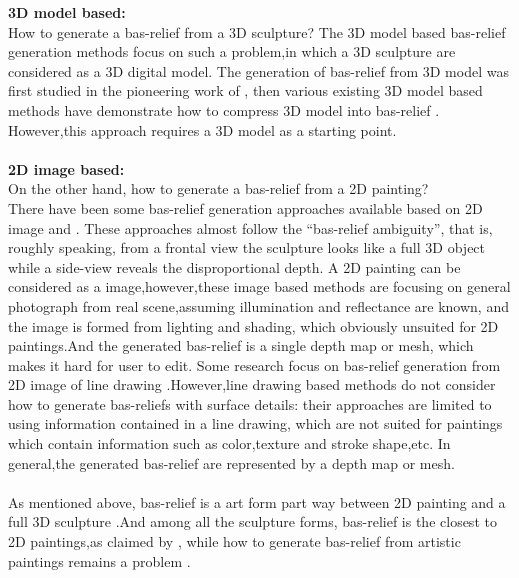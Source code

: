 \textbf{3D model based:}\\ How to generate a bas-relief from a 3D sculpture? The 3D model based bas-relief generation methods focus on such a problem,in which a 3D sculpture are considered as a 3D digital model.   The generation of bas-relief from 3D model was first studied in the pioneering work of \cite{cignoni1997computer}, then various existing 3D model based methods have demonstrate how to compress 3D model into bas-relief \cite{weyrich2007digital}\cite{kerber2009feature}\cite{song2007automatic}\cite{sun2009bas} . However,this approach requires a 3D model as a starting point. \\ \\
\textbf{2D image based:}\\On the other hand, how to generate a bas-relief from a 2D painting? \\ There have been some bas-relief generation approaches available based on 2D image \cite{zeng2014region}\cite{wu2013making} and \cite{alexa2010reliefs}.  These approaches almost follow the “bas-relief ambiguity”\cite{belhumeur1999bas}, that is, roughly speaking, from a frontal view the sculpture looks like a full 3D object while a side-view reveals the disproportional depth. 
A 2D painting can be considered as a image,however,these image based methods are focusing on general photograph from real scene,assuming illumination and reflectance are known, and the image is formed from lighting and shading, which obviously unsuited for 2D paintings.And the generated bas-relief is a single depth map or mesh, which makes it hard for user to edit. 
Some research focus on bas-relief generation from 2D image of line drawing \cite{kolomenkin2011reconstruction}\cite{varley2002estimating}\cite{malik1987interpreting}\cite{sykora2014ink}.However,line drawing based methods do not consider how to generate bas-reliefs with surface details: their approaches are limited to using information contained in a line drawing, which are not suited for paintings which contain information such as color,texture and stroke shape,etc. In general,the generated bas-relief are represented by a depth map or mesh.  \\ \\  
As mentioned above, bas-relief is a art form part way between 2D painting and a full 3D sculpture\cite{benzaid2017analysis}\cite{weyrich2007digital}\cite{kerber2009feature}\cite{kerber2012computer}\cite{zeng2014region} .And among all the sculpture forms, bas-relief is the closest to 2D paintings,as claimed by \cite{kerber2009feature} \cite{barron2012color}, while how to generate bas-relief from artistic paintings remains a problem . \\ \\  
